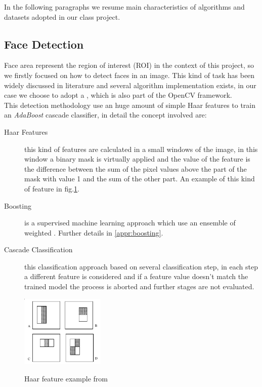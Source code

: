 In the following paragraphs we resume main characteristics of algorithms and datasets adopted in our class project. 


\subsection{Face Detection}

Face area represent the region of interest (ROI) in the context of this project, so we firstly focused on how to detect faces in an image. This kind of task has been widely discussed in literature and several algorithm implementation exists, in our case we choose to adopt a \cite{Viola01rapidobject}, which is also part of the OpenCV framework.\\
This detection methodology use an huge amount of simple Haar features to train an \emph{AdaBoost} cascade classifier, in detail the concept involved are:

\begin{description}
\item[Haar Features] this kind of features are calculated in a small windows of the image, in this window a binary mask is virtually applied and the value of the feature is the difference between the sum of the pixel values above the part of the mask with value 1 and the sum of the other part. An example of this kind of feature in fig.\ref{fig:haar}.
\item[Boosting] is a supervised machine learning approach which use an ensemble of weighted . Further details in \ref{appr:boosting}.
\item[Cascade Classification] this classification approach based on several classification step, in each step a different feature is considered and if a feature value doesn't match the trained model the process is aborted and further stages are not evaluated.
\end{description}

\begin{figure}[!b]
\centering
\includegraphics[width=4cm]{images/haarfeatures.png}
\label{fig:haar}
\caption{Haar feature example from \cite{Viola01rapidobject} }
\end{figure}


